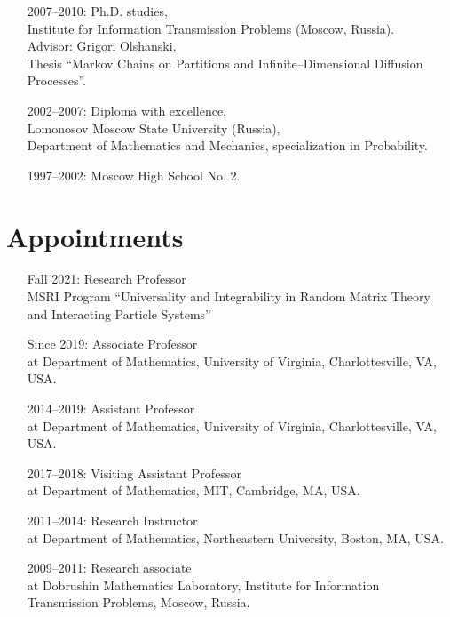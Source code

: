 \documentclass[letterpaper,11pt]{article}
\begin{document}
\begin{itemize}
	\item
	      [2007--2010:]
	      Ph.D. studies,\\Institute for Information Transmission Problems
	      (Moscow, Russia). \\ Advisor:
	      \href{http://www.iitp.ru/en/userpages/88/}{Grigori Olshanski}.\\ Thesis
	      ``Markov Chains on Partitions and Infinite--Dimensional Diffusion Processes''.

	\item
	      [2002--2007:]
	      Diploma with excellence,\\ Lomonosov Moscow State University
	      (Russia),\\ Department of Mathematics and Mechanics, specialization in Probability.

	\item
	      [1997--2002:] Moscow High School No. 2.

\end{itemize}

\section*{Appointments}

\begin{itemize}
	\item [Fall 2021:]
		  Research Professor
		  \\
		  MSRI Program ``Universality and Integrability in Random Matrix Theory and Interacting Particle Systems''
	\item
	      [Since 2019:]
	      Associate Professor\\ at Department of Mathematics, University
	      of Virginia, Charlottesville, VA, USA.
	\item
	      [2014--2019:]
	      Assistant Professor\\ at Department of Mathematics, University
	      of Virginia, Charlottesville, VA, USA.
	\item
	      [2017--2018:]
	      Visiting Assistant Professor\\ at Department of Mathematics, MIT, 
	      Cambridge, MA, USA.
	\item
	      [2011--2014:]
	      Research Instructor\\ at Department of Mathematics, Northeastern
	      University, Boston, MA, USA.
	\item
	      [2009--2011:]
	      Research associate\\ at Dobrushin Mathematics Laboratory,
	      Institute for Information Transmission Problems, Moscow, Russia.
\end{itemize}
\end{document}

